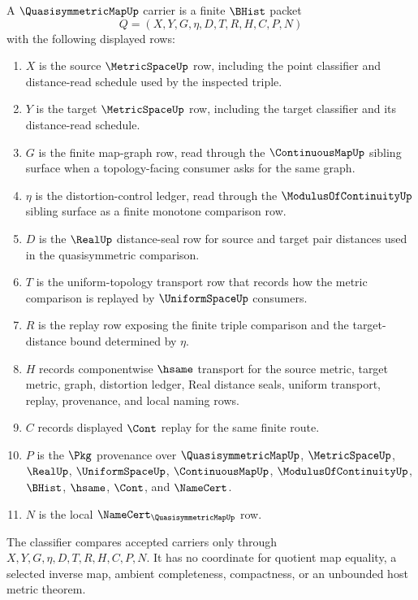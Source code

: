 \begin{definition}
\label{def:quasisymmetric-map-carrier}
A $\QuasisymmetricMapUp$ carrier is a finite $\BHist$ packet
$$
Q=(X,Y,G,\eta,D,T,R,H,C,P,N)
$$
with the following displayed rows:
\begin{enumerate}
\item $X$ is the source $\MetricSpaceUp$ row, including the point classifier and distance-read schedule used by the inspected triple.
\item $Y$ is the target $\MetricSpaceUp$ row, including the target classifier and its distance-read schedule.
\item $G$ is the finite map-graph row, read through the $\ContinuousMapUp$ sibling surface when a topology-facing consumer asks for the same graph.
\item $\eta$ is the distortion-control ledger, read through the $\ModulusOfContinuityUp$ sibling surface as a finite monotone comparison row.
\item $D$ is the $\RealUp$ distance-seal row for source and target pair distances used in the quasisymmetric comparison.
\item $T$ is the uniform-topology transport row that records how the metric comparison is replayed by $\UniformSpaceUp$ consumers.
\item $R$ is the replay row exposing the finite triple comparison and the target-distance bound determined by $\eta$.
\item $H$ records componentwise $\hsame$ transport for the source metric, target metric, graph, distortion ledger, Real distance seals, uniform transport, replay, provenance, and local naming rows.
\item $C$ records displayed $\Cont$ replay for the same finite route.
\item $P$ is the $\Pkg$ provenance over $\QuasisymmetricMapUp$, $\MetricSpaceUp$, $\RealUp$, $\UniformSpaceUp$, $\ContinuousMapUp$, $\ModulusOfContinuityUp$, $\BHist$, $\hsame$, $\Cont$, and $\NameCert$.
\item $N$ is the local $\NameCert_{\QuasisymmetricMapUp}$ row.
\end{enumerate}
The classifier compares accepted carriers only through $X,Y,G,\eta,D,T,R,H,C,P,N$. It has no coordinate for quotient map equality, a selected inverse map, ambient completeness, compactness, or an unbounded host metric theorem.
\end{definition}

